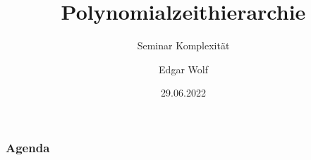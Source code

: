 \documentclass{beamer}
\title{Polynomialzeithierarchie}
\subtitle{Seminar Komplexität}
\author{Edgar Wolf}
\institute{Hochschule Kempten}
\date{29.06.2022}
\begin{document}
\begin{frame}
    \titlepage
\end{frame}

\begin{frame}
    \frametitle{Agenda}
    \tableofcontents
\end{frame}






\end{document}
